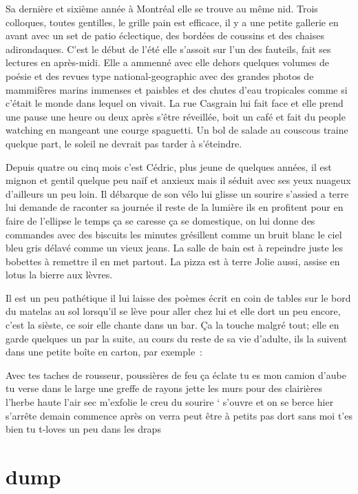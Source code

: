 Sa dernière et sixième année à Montréal elle se trouve au même nid. Trois
colloques, toutes gentilles, le grille pain est efficace, il y a une petite
gallerie en avant avec un set de patio éclectique, des bordées de coussins et
des chaises adirondaques. C’est le début de l’été elle s’assoit sur l’un des
fauteils, fait ses lectures en après-midi. Elle a ammenné avec elle dehors
quelques volumes de poésie et des revues type national-geographic avec des
grandes photos de mammifères marins immenses et paisbles et des chutes d’eau
tropicales comme si c’était le monde dans lequel on vivait. La rue Casgrain lui
fait face et elle prend une pause une heure ou deux après s'être
réveillée, boit un café et fait du people watching en mangeant une courge
spaguetti. Un bol de salade au couscous traine quelque part, le soleil ne devrait
pas tarder à s'éteindre.



Depuis quatre ou cinq mois c’est Cédric, plus jeune de quelques années, il est
mignon et gentil quelque peu naïf et anxieux mais il séduit avec ses yeux
nuageux d’ailleurs un peu loin. Il débarque de son vélo lui glisse un sourire
s'assied a terre lui demande de raconter sa journée il reste de la lumière
ils en profitent pour en faire de l'ellipse le temps ça se caresse ça se
domestique, on lui donne des commandes avec des biscuits les minutes grésillent
comme un bruit blanc le ciel bleu gris délavé comme un vieux jeans. La salle de bain est 
à repeindre juste les bobettes à remettre il en met partout. La pizza est à terre Jolie
aussi, assise en lotus la bierre aux lèvres. 


Il est un peu pathétique il lui laisse des poèmes écrit en coin de tables 
sur le bord du matelas au sol lorsqu'il se lève pour aller chez lui et elle
dort un peu encore, c'est la sièste, ce soir elle chante dans un bar. Ça la
touche malgré tout; elle en garde quelques un par la suite, au cours du reste
de sa vie d’adulte, ils la suivent
dans une petite boîte en carton, par exemple :
\begin{flushright}
Avec tes taches de rousseur, poussières de feu
ça éclate tu es mon camion d’aube tu
verse dans le large une greffe de rayons
jette les murs pour des clairières
l’herbe haute l’air sec m’exfolie
le creu du sourire
‘ s’ouvre et on se berce hier s’arrête
demain commence après on verra
peut être
à petits pas
dort sans moi t’es bien
tu t-loves un peu dans les draps
\end{flushright}
\newpage
\section{dump}

